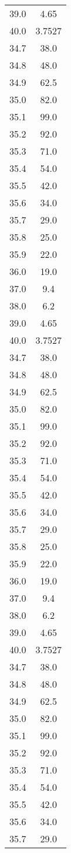 \begin{table}
\begin{tabular}{S[]S[]}
39.0 & 4.65\\
40.0 & 3.7527\\
34.7 & 38.0\\
34.8 & 48.0\\
34.9 & 62.5\\
35.0 & 82.0\\
35.1 & 99.0\\
35.2 & 92.0\\
35.3 & 71.0\\
35.4 & 54.0\\
35.5 & 42.0\\
35.6 & 34.0\\
35.7 & 29.0\\
35.8 & 25.0\\
35.9 & 22.0\\
36.0 & 19.0\\
37.0 & 9.4\\
38.0 & 6.2\\
39.0 & 4.65\\
40.0 & 3.7527\\
34.7 & 38.0\\
34.8 & 48.0\\
34.9 & 62.5\\
35.0 & 82.0\\
35.1 & 99.0\\
35.2 & 92.0\\
35.3 & 71.0\\
35.4 & 54.0\\
35.5 & 42.0\\
35.6 & 34.0\\
35.7 & 29.0\\
35.8 & 25.0\\
35.9 & 22.0\\
36.0 & 19.0\\
37.0 & 9.4\\
38.0 & 6.2\\
39.0 & 4.65\\
40.0 & 3.7527\\
34.7 & 38.0\\
34.8 & 48.0\\
34.9 & 62.5\\
35.0 & 82.0\\
35.1 & 99.0\\
35.2 & 92.0\\
35.3 & 71.0\\
35.4 & 54.0\\
35.5 & 42.0\\
35.6 & 34.0\\
35.7 & 29.0\\

\end{tabular}
\end{table}
